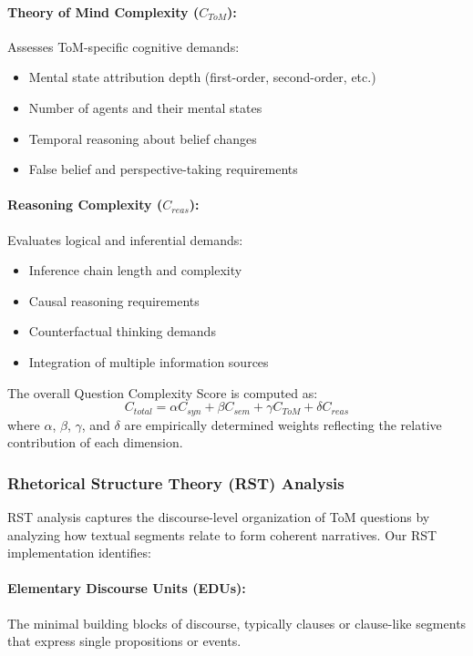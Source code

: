 \documentclass[12pt]{article}
\begin{document}
\paragraph{Theory of Mind Complexity ($C_{ToM}$):} Assesses ToM-specific cognitive demands:
\begin{itemize}
    \item Mental state attribution depth (first-order, second-order, etc.)
    \item Number of agents and their mental states
    \item Temporal reasoning about belief changes
    \item False belief and perspective-taking requirements
\end{itemize}

\paragraph{Reasoning Complexity ($C_{reas}$):} Evaluates logical and inferential demands:
\begin{itemize}
    \item Inference chain length and complexity
    \item Causal reasoning requirements
    \item Counterfactual thinking demands
    \item Integration of multiple information sources
\end{itemize}

The overall Question Complexity Score is computed as:
\begin{equation}
C_{total} = \alpha C_{syn} + \beta C_{sem} + \gamma C_{ToM} + \delta C_{reas}
\end{equation}
where $\alpha$, $\beta$, $\gamma$, and $\delta$ are empirically determined weights reflecting the relative contribution of each dimension.

\subsubsection{Rhetorical Structure Theory (RST) Analysis}

RST analysis captures the discourse-level organization of ToM questions by analyzing how textual segments relate to form coherent narratives. Our RST implementation identifies:

\paragraph{Elementary Discourse Units (EDUs):} The minimal building blocks of discourse, typically clauses or clause-like segments that express single propositions or events.
\end{document}
